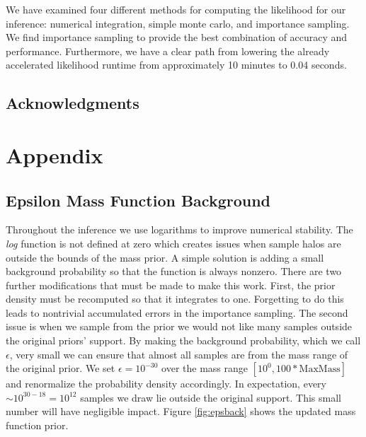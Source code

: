 \documentclass[\docopts]{\docclass}
\begin{document}
We have examined four different methods for computing the likelihood for our inference: numerical integration, simple monte carlo, and importance sampling. We find importance sampling to provide the best combination of accuracy and performance. Furthermore, we have a clear path from lowering the already accelerated likelihood runtime from approximately 10 minutes to 0.04 seconds.



\subsection*{Acknowledgments}








\newpage

\section{Appendix}
\label{sec:appendix}

\subsection{Epsilon Mass Function Background}
\label{subsec:epsilon_back}
Throughout the inference we use logarithms to improve numerical stability.
The \emph{log} function is not defined at zero which creates issues when sample halos are outside the bounds of the mass prior. 
A simple solution is adding a small background probability so that the function is always nonzero. 
There are two further modifications that must be made to make this work. 
First, the prior density must be recomputed so that it integrates to one.
Forgetting to do this leads to nontrivial accumulated errors in the importance sampling.
The second issue is when we sample from the prior we would not like many samples outside the original priors' support.
By making the background probability, which we call $\epsilon$, very small we can ensure that almost all samples are from the mass range of the original prior. 
We set $\epsilon = 10^{-30}$ over the mass range $[10^0, 100 * \text{MaxMass}]$ and renormalize the probability density accordingly.
In expectation, every $\sim 10^{30-18} = 10^{12}$ samples we draw lie outside the original support.
This small number will have negligible impact.
Figure \ref{fig:epsback} shows the updated mass function prior.
\end{document}
